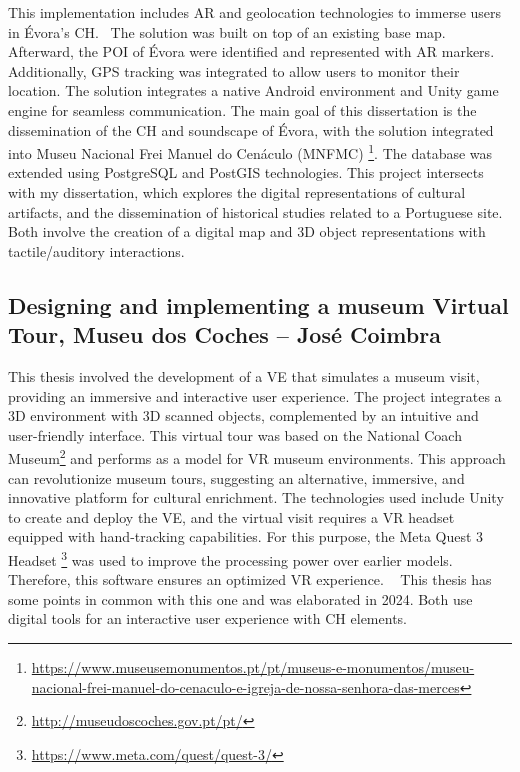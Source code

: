 This implementation includes \gls{AR} and geolocation technologies to immerse users in Évora's \gls{CH}.~\cite{vilar2024extended}
The solution was built on top of an existing base map. Afterward, the \gls{POI} of Évora were identified and represented with \gls{AR} markers. Additionally, GPS tracking was
  integrated to allow users to monitor their location.
The solution integrates a native Android environment and Unity game engine for seamless communication. The main goal of this dissertation is the dissemination of the \gls{CH} 
and soundscape of Évora, with the solution integrated into Museu Nacional Frei Manuel do Cenáculo (MNFMC) \footnote{\url{https://www.museusemonumentos.pt/pt/museus-e-monumentos/museu-nacional-frei-manuel-do-cenaculo-e-igreja-de-nossa-senhora-das-merces}}. 
The database was extended using PostgreSQL and PostGIS technologies.
This project intersects with my dissertation, which explores the digital representations of cultural artifacts, and the dissemination of historical studies related to a Portuguese site. 
Both involve the creation of a digital map and \gls{3D} object representations with tactile/auditory interactions.

\subsection{Designing and implementing a museum Virtual Tour, Museu dos Coches – José Coimbra}
\label{sec:thesis2_nova}

This thesis involved the development of a \gls{VE} that simulates a museum visit, providing an immersive and interactive user experience. The project integrates a \gls{3D} environment 
with \gls{3D} scanned objects, complemented by an intuitive and user-friendly interface. 
This virtual tour was based on the National Coach Museum\footnote{\url{http://museudoscoches.gov.pt/pt/}} and performs as a model for \gls{VR} museum environments. This approach can revolutionize 
museum tours, suggesting an alternative, immersive, and innovative platform for cultural enrichment. 
The technologies used include Unity to create and deploy the \gls{VE}, and the virtual visit requires a \gls{VR} headset equipped with hand-tracking capabilities. For this purpose, 
the Meta Quest 3 Headset \footnote{\url{https://www.meta.com/quest/quest-3/}} was used to improve the processing power over earlier models. Therefore, this software ensures an optimized \gls{VR} experience. ~\cite{tese_tourCoimbra2024}
This thesis has some points in common with this one and was elaborated in 2024. Both use digital tools for an interactive user experience with \gls{CH} elements.


